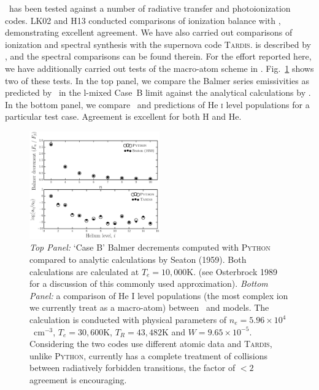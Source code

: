 \documentclass[preprint, a4paper, 11pt]{aastex}
\begin{document}
\py\ has been tested against a number of radiative transfer and
photoionization codes. LK02 and H13 conducted comparisons of 
ionization balance  with \cld \citep{cloudy2013}, demonstrating
excellent agreement. We have also carried out comparisons
of ionization and spectral synthesis with the supernova code
\textsc{Tardis.} \tar is described by 
\cite{kerzendorfsim}, and the spectral comparisons can be found
therein. For the effort reported here, we have additionally carried
out tests of the macro-atom scheme in \py. Fig.~\ref{tests} shows
two of these tests. In the top panel, we compare the Balmer series 
emissivities as predicted by \py\ in the l-mixed Case~B limit against the
analytical calculations by \cite{seaton1959}. In the bottom panel, we
compare \py\ and \tar predictions of  He \textsc{i} level populations
for a particular test case. Agreement is excellent for both H and He.

\begin{figure}
\centering
\includegraphics[width=0.5\textwidth]{figures/fig_caseb_tardis.eps}
\caption{
{\sl Top Panel:} `Case B' Balmer decrements computed 
with \textsc{Python} compared to analytic calculations
by Seaton (1959). Both calculations are calculated at $T_e=10,000$K.
(see Osterbrock 1989 for a discussion of this commonly used approximation).
{\sl Bottom Panel:}  a comparison of He I level populations (the most complex ion we currently 
treat as a macro-atom) between \py\ and \tar models. 
The calculation is conducted with physical parameters of $n_e=5.96\times10^4$~cm$^{-3}$,
$T_e=30,600$K, $T_R=43,482$K and $W=9.65\times10^{-5}$. 
Considering the two codes use different atomic data and \textsc{Tardis,} unlike \textsc{Python,} currently has a complete treatment of collisions between 
radiatively forbidden transitions, the factor of 
$<2$ agreement is encouraging. 
}
\label{tests}
\end{figure}


\nocite{osterbrock}
\nocite{seaton1959}
\end{document}
